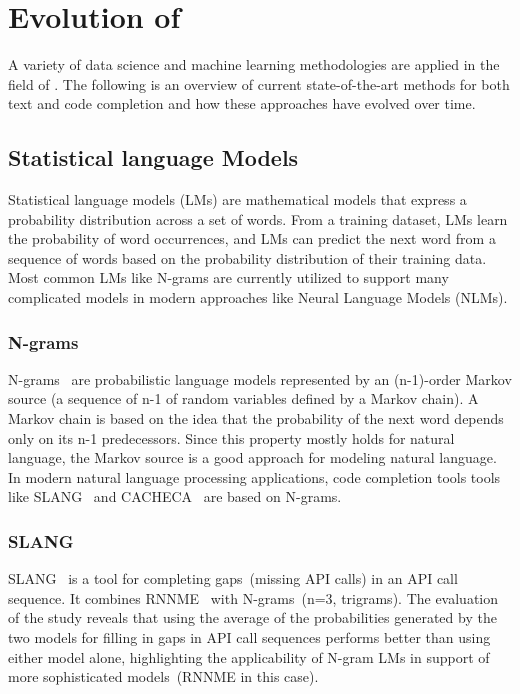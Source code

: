 \section{Evolution of \cct{}}
A variety of data science and machine learning methodologies are applied in the field of \cct{}. The following is an overview of current state-of-the-art methods for both text and code completion and how these approaches have evolved over time.

\subsection{Statistical language Models}
Statistical language models (LMs) are mathematical models that express a probability distribution across a set of words. From a training dataset, LMs learn the probability of word occurrences, and LMs can predict the next word from a sequence of words based on the probability distribution of their training data. Most common LMs like N-grams are currently utilized to support many complicated models in modern approaches like Neural Language Models (NLMs).

\subsubsection{N-grams}
N-grams~\cite{ngram} are probabilistic language models represented by an (n-1)-order Markov source (a sequence of n-1 of random variables defined by a Markov chain). A Markov chain is based on the idea that the probability of the next word depends only on its n-1 predecessors. Since this property mostly holds for natural language, the Markov source is a good approach for modeling natural language. In modern natural language processing applications, 
code completion tools tools like SLANG~\cite{slang} and CACHECA~\cite{cacheca} are based on N-grams.

\subsubsection{SLANG}
SLANG~\cite{slang} is a tool for completing gaps~(missing API calls) in an API call sequence. It combines RNNME~\cite{rnnme} with N-grams~(n=3, trigrams). 
The evaluation of the study reveals that using the average of the probabilities generated by the two models for filling in gaps in API call sequences performs better than using either model alone, highlighting the applicability of N-gram LMs in support of more sophisticated models~(RNNME in this case).


